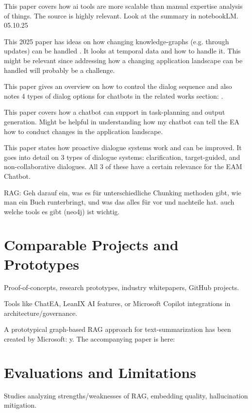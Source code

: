 This paper covers how ai tools are more scalable than manual expertise analysis of things. The source is highly relevant. Look at the summary in notebookLM. 05.10.25 \cite{gu2024survey}

This 2025 paper has ideas on how changing knowledge-graphs (e.g. through updates) can be handled \cite{temporalGraphRag}. It looks at temporal data and how to handle it. This might be relevant since addressing how a changing application landscape can be handled will probably be a challenge.

This paper gives an overview on how to control the dialog sequence and also notes 4 types of dialog options for chatbots in the related works section: \cite{li2025chatsopsopguidedmctsplanning}.

This paper \cite{Zhai_2025} covers how a chatbot can support in task-planning and output generation. Might be helpful in understanding how my chatbot can tell the EA how to conduct changes in the application landscape.

This paper \cite{deng2023promptingevaluatinglargelanguage} states how proactive dialogue systems work and can be improved. It goes into detail on 3 types of dialogue systems: clarification, target-guided, and non-collaborative dialogues. All 3 of these have a certain relevance for the EAM Chatbot.

RAG: Geh darauf ein, was es für unterschiedliche Chunking methoden gibt, wie man ein Buch runterbringt, und was das alles für vor und nachteile hat. auch welche tools es gibt (neo4j) ist wichtig.

%
%
\section{Comparable Projects and Prototypes}
\label{sec:intro:prototypes}
Proof-of-concepts, research prototypes, industry whitepapers, GitHub projects.

Tools like ChatEA, LeanIX AI features, or Microsoft Copilot integrations in architecture/governance.

A prototypical graph-based RAG approach for text-summarization has been created by Microsoft: y\cite{MsGraphRAGPrototype}. The accompanying paper is here: \cite{MsGraphRAGPaper}

%
%
\section{Evaluations and Limitations}
\label{sec:intro:limitations}
Studies analyzing strengths/weaknesses of RAG, embedding quality, hallucination mitigation.

